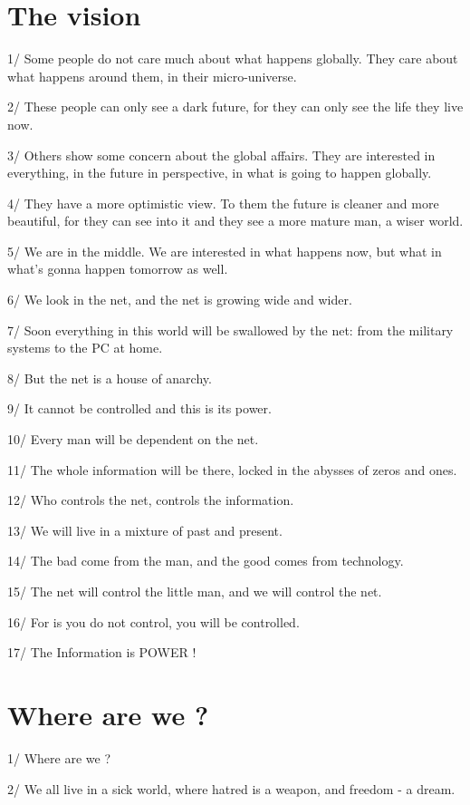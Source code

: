 \documentclass[letterpaper,12pt,english]{sphinxmanual}
\begin{document}
\section{The vision}
\label{1997:the-vision}
1/ Some people do not care much about what happens globally. They care about what happens around them, in their micro-universe.

2/ These people can only see a dark future, for they can only see the life they live now.

3/ Others show some concern about the global affairs. They are interested in everything, in the future in perspective, in what is going to happen globally.

4/ They have a more optimistic view. To them the future is cleaner and more beautiful, for they can see into it and they see a more mature man, a wiser world.

5/ We are in the middle. We are interested in what happens now, but what in what's gonna happen tomorrow as well.

6/ We look in the net, and the net is growing wide and wider.

7/ Soon everything in this world will be swallowed by the net: from the military systems to the PC at home.

8/ But the net is a house of anarchy.

9/ It cannot be controlled and this is its power.

10/ Every man will be dependent on the net.

11/ The whole information will be there, locked in the abysses of zeros and ones.

12/ Who controls the net, controls the information.

13/ We will live in a mixture of past and present.

14/ The bad come from the man, and the good comes from technology.

15/ The net will control the little man, and we will control the net.

16/ For is you do not control, you will be controlled.

17/ The Information is POWER !


\section{Where are we ?}
\label{1997:where-are-we}
1/ Where are we ?

2/ We all live in a sick world, where hatred is a weapon, and freedom - a dream.
\end{document}
